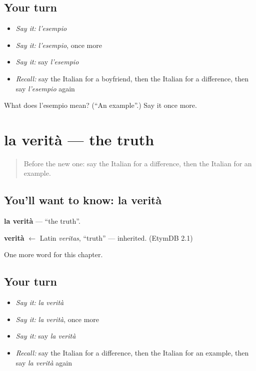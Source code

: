 \subsection*{Your turn}
\begin{itemize}
\raggedright
  \item \emph{Say it:} \emph{l'esempio}
  \item \emph{Say it:} \emph{l'esempio}, once more
  \item \emph{Say it:} say \emph{l'esempio}
  \item \emph{Recall:} say the Italian for a boyfriend, then the Italian for a difference, then say \emph{l'esempio} again
\end{itemize}

\begin{tcolorbox}[breakable,colback=teal!4,colframe=teal!35!black,title={Before you move on}]
What does l'esempio mean? (\textquotedblleft{}An example\textquotedblright{}.) Say it once more.
\end{tcolorbox}
\section[la verità]{la verità — the truth}

\label{lesson:IT-C252-verita}



\begin{quote}
Before the new one: say the Italian for a difference, then the Italian for an example.
\end{quote}

\subsection*{You'll want to know: la verità}
\textbf{la verità} — \textquotedblleft{}the truth\textquotedblright{}.

\begin{cousinweb}
\textbf{verità} $\leftarrow$ Latin \emph{veritas}, \textquotedblleft{}truth\textquotedblright{} — inherited. (EtymDB 2.1)
\end{cousinweb}

\begin{grammarlens}[title={What you've built}]
One more word for this chapter.
\end{grammarlens}

\subsection*{Your turn}
\begin{itemize}
\raggedright
  \item \emph{Say it:} \emph{la verità}
  \item \emph{Say it:} \emph{la verità}, once more
  \item \emph{Say it:} say \emph{la verità}
  \item \emph{Recall:} say the Italian for a difference, then the Italian for an example, then say \emph{la verità} again
\end{itemize}

